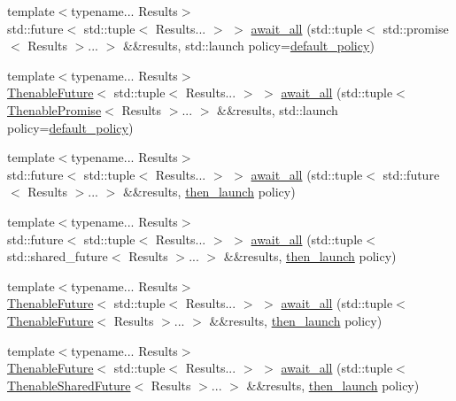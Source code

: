\begin{DoxyCompactItemize}
\item 
{\footnotesize template$<$typename... Results$>$ }\\std\+::future$<$ std\+::tuple$<$ Results... $>$ $>$ \hyperlink{namespacethenable_a2b77cbbe1f031af6dbea0797de52894a}{await\+\_\+all} (std\+::tuple$<$ std\+::promise$<$ Results $>$... $>$ \&\&results, std\+::launch policy=\hyperlink{namespacethenable_a55a20a452e9ba9c0eff946d9b8636f06}{default\+\_\+policy})
\item 
{\footnotesize template$<$typename... Results$>$ }\\\hyperlink{classthenable_1_1_thenable_future}{Thenable\+Future}$<$ std\+::tuple$<$ Results... $>$ $>$ \hyperlink{namespacethenable_a80d6c4269437d398a16de61461415242}{await\+\_\+all} (std\+::tuple$<$ \hyperlink{classthenable_1_1_thenable_promise}{Thenable\+Promise}$<$ Results $>$... $>$ \&\&results, std\+::launch policy=\hyperlink{namespacethenable_a55a20a452e9ba9c0eff946d9b8636f06}{default\+\_\+policy})
\item 
{\footnotesize template$<$typename... Results$>$ }\\std\+::future$<$ std\+::tuple$<$ Results... $>$ $>$ \hyperlink{namespacethenable_a52de34f95415017a3716c1e7c37ace7f}{await\+\_\+all} (std\+::tuple$<$ std\+::future$<$ Results $>$... $>$ \&\&results, \hyperlink{namespacethenable_adf31291b806157ad914943dae5b3c94e}{then\+\_\+launch} policy)
\item 
{\footnotesize template$<$typename... Results$>$ }\\std\+::future$<$ std\+::tuple$<$ Results... $>$ $>$ \hyperlink{namespacethenable_a7b2baeb104fb7115a97586739f08af1e}{await\+\_\+all} (std\+::tuple$<$ std\+::shared\+\_\+future$<$ Results $>$... $>$ \&\&results, \hyperlink{namespacethenable_adf31291b806157ad914943dae5b3c94e}{then\+\_\+launch} policy)
\item 
{\footnotesize template$<$typename... Results$>$ }\\\hyperlink{classthenable_1_1_thenable_future}{Thenable\+Future}$<$ std\+::tuple$<$ Results... $>$ $>$ \hyperlink{namespacethenable_a7e395690cce41b4b74628f989ca90c9c}{await\+\_\+all} (std\+::tuple$<$ \hyperlink{classthenable_1_1_thenable_future}{Thenable\+Future}$<$ Results $>$... $>$ \&\&results, \hyperlink{namespacethenable_adf31291b806157ad914943dae5b3c94e}{then\+\_\+launch} policy)
\item 
{\footnotesize template$<$typename... Results$>$ }\\\hyperlink{classthenable_1_1_thenable_future}{Thenable\+Future}$<$ std\+::tuple$<$ Results... $>$ $>$ \hyperlink{namespacethenable_af6530bd65e65f6c860e43b5b7ab498a1}{await\+\_\+all} (std\+::tuple$<$ \hyperlink{classthenable_1_1_thenable_shared_future}{Thenable\+Shared\+Future}$<$ Results $>$... $>$ \&\&results, \hyperlink{namespacethenable_adf31291b806157ad914943dae5b3c94e}{then\+\_\+launch} policy)

\end{DoxyCompactItemize}
